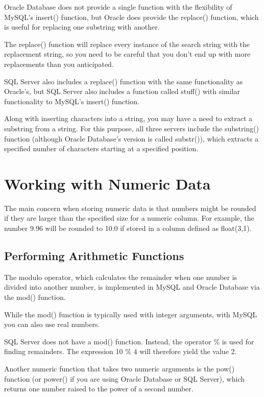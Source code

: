 Oracle Database does not provide a single function with the flexibility of MySQL's insert() function, but Oracle does provide the replace() function, which is useful for replacing one substring with another.

The replace() function will replace every instance of the search string with the replacement string, so you need to be careful that you don't end up with more replacements than you anticipated.

SQL Server also includes a replace() function with the same functionality as Oracle's, but SQL Server also includes a function called stuff() with similar functionality to MySQL's insert() function.

Along with inserting characters into a string, you may have a need to extract a substring from a string. For this purpose, all three servers include the substring() function (although Oracle Database's version is called substr()), which extracts a specified number of characters starting at a specified position.

\section{Working with Numeric Data}
The main concern when storing numeric data is that numbers might be rounded if they are larger than the specified size for a numeric column. For example, the number 9.96 will be rounded to 10.0 if stored in a column defined as float(3,1).

\subsection{Performing Arithmetic Functions}
The modulo operator, which calculates the remainder when one number is divided into another number, is implemented in MySQL and Oracle Database via the mod() function.

While the mod() function is typically used with integer arguments, with MySQL you can also use real numbers.

\begin{tcolorbox}
    SQL Server does not have a mod() function. Instead, the operator \% is used for finding remainders. The expression 10 \% 4 will therefore yield the value 2.
\end{tcolorbox}

Another numeric function that takes two numeric arguments is the pow() function (or power() if you are using Oracle Database or SQL Server), which returns one number raised to the power of a second number.

